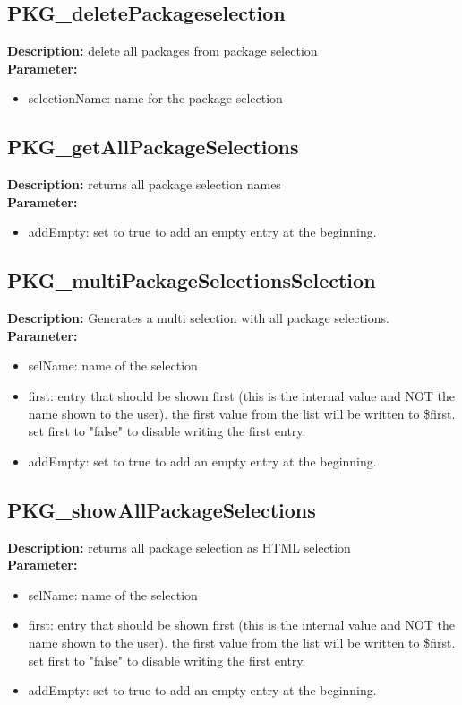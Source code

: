 \subsection{PKG\_deletePackageselection}
\textbf{Description:} delete all packages from package selection\\
\textbf{Parameter:}
\begin{itemize}
\item selectionName: name for the package selection
\end{itemize}

\subsection{PKG\_getAllPackageSelections}
\textbf{Description:} returns all package selection names\\
\textbf{Parameter:}
\begin{itemize}
\item addEmpty: set to true to add an empty entry at the beginning.
\end{itemize}

\subsection{PKG\_multiPackageSelectionsSelection}
\textbf{Description:} Generates a multi selection with all package selections.\\
\textbf{Parameter:}
\begin{itemize}
\item selName: name of the selection
\item first: entry that should be shown first (this is the internal value and NOT the name shown to the user). the first value from the list will be written to \$first. set first to "false" to disable writing the first entry.
\item addEmpty: set to true to add an empty entry at the beginning.
\end{itemize}

\subsection{PKG\_showAllPackageSelections}
\textbf{Description:} returns all package selection as HTML selection\\
\textbf{Parameter:}
\begin{itemize}
\item selName: name of the selection
\item first: entry that should be shown first (this is the internal value and NOT the name shown to the user). the first value from the list will be written to \$first. set first to "false" to disable writing the first entry.
\item addEmpty: set to true to add an empty entry at the beginning.
\end{itemize}

